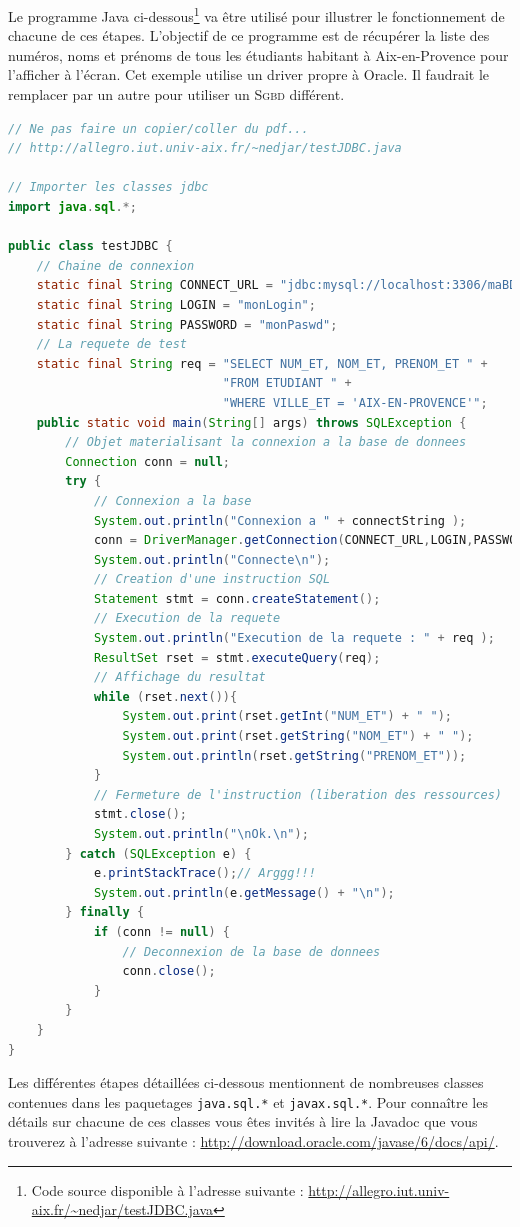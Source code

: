 \documentclass[a4paper,11pt]{article}
\begin{document}
Le programme Java ci-dessous\footnote{Code source disponible à l'adresse suivante : 
\url{http://allegro.iut.univ-aix.fr/~nedjar/testJDBC.java}} va être utilisé pour illustrer le fonctionnement de chacune 
de ces étapes. L'objectif de ce programme est de récupérer la liste des numéros, noms et prénoms de tous les étudiants 
habitant à Aix-en-Provence pour l'afficher à l'écran. Cet exemple utilise un driver propre à 
Oracle. Il faudrait le remplacer par un autre pour utiliser un \textsc{Sgbd} différent.
\pagebreak
\begin{lstlisting}[language=java]
// Ne pas faire un copier/coller du pdf...
// http://allegro.iut.univ-aix.fr/~nedjar/testJDBC.java

// Importer les classes jdbc
import java.sql.*;

public class testJDBC {
	// Chaine de connexion
	static final String CONNECT_URL = "jdbc:mysql://localhost:3306/maBD";
	static final String LOGIN = "monLogin";
	static final String PASSWORD = "monPaswd";
	// La requete de test
	static final String req = "SELECT NUM_ET, NOM_ET, PRENOM_ET " +
	                          "FROM ETUDIANT " +
	                          "WHERE VILLE_ET = 'AIX-EN-PROVENCE'";                                     
	public static void main(String[] args) throws SQLException {
		// Objet materialisant la connexion a la base de donnees
		Connection conn = null;
		try {
			// Connexion a la base
			System.out.println("Connexion a " + connectString );
			conn = DriverManager.getConnection(CONNECT_URL,LOGIN,PASSWORD);
			System.out.println("Connecte\n");
			// Creation d'une instruction SQL
			Statement stmt = conn.createStatement();
			// Execution de la requete
			System.out.println("Execution de la requete : " + req );
			ResultSet rset = stmt.executeQuery(req);
			// Affichage du resultat
			while (rset.next()){	
				System.out.print(rset.getInt("NUM_ET") + " ");
				System.out.print(rset.getString("NOM_ET") + " ");
				System.out.println(rset.getString("PRENOM_ET"));
			}
			// Fermeture de l'instruction (liberation des ressources)
			stmt.close();
			System.out.println("\nOk.\n");
		} catch (SQLException e) {
			e.printStackTrace();// Arggg!!!
			System.out.println(e.getMessage() + "\n");
		} finally {
			if (conn != null) {
				// Deconnexion de la base de donnees
				conn.close();
			}
		}
	}
}
\end{lstlisting}
Les différentes étapes détaillées ci-dessous mentionnent de nombreuses classes contenues dans les paquetages 
\texttt{java.sql.*} et \texttt{javax.sql.*}. Pour connaître les détails sur chacune de ces classes vous êtes 
invités à lire la Javadoc que vous trouverez à l'adresse suivante : \url{http://download.oracle.com/javase/6/docs/api/}.
\end{document}
